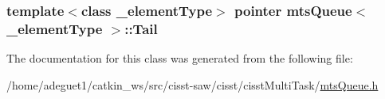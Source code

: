 \hypertarget{classmts_queue_a3fc27909e8863597f5cc79288f555a9d}{
\subsubsection[{Tail}]{\setlength{\rightskip}{0pt plus 5cm}template$<$class \-\_\-element\-Type$>$ {\bf pointer} {\bf mts\-Queue}$<$ \-\_\-element\-Type $>$\-::Tail\hspace{0.3cm}{\ttfamily [protected]}}}\label{classmts_queue_a3fc27909e8863597f5cc79288f555a9d}


The documentation for this class was generated from the following file\-:\begin{DoxyCompactItemize}
\item 
/home/adeguet1/catkin\-\_\-ws/src/cisst-\/saw/cisst/cisst\-Multi\-Task/\hyperlink{mts_queue_8h}{mts\-Queue.\-h}\end{DoxyCompactItemize}
